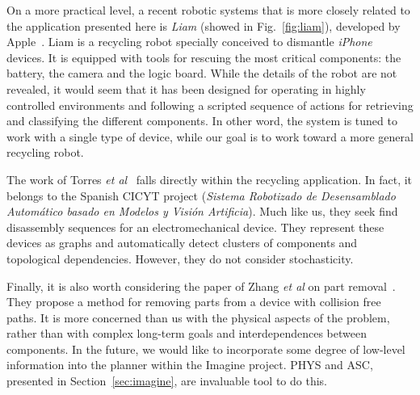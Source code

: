 \documentclass[../root.tex]{subfiles}
\begin{document}
On a more practical level, a recent robotic systems that is more
closely related to the application
presented here is \emph{Liam} (showed in Fig.~\ref{fig:liam}), developed by Apple~\cite{kamps2016apple}.
Liam is a recycling robot specially conceived to dismantle \emph{iPhone}
devices. It is equipped with tools for rescuing the most critical components:
the battery, the camera and the logic board. While the details of the robot
are not revealed, it would seem that it has been designed for operating
in highly controlled environments and following a scripted sequence of
actions for retrieving and classifying the different components. In other
word, the system is tuned to work with a single type of device, while our
goal is to work toward a more general recycling robot.

The work of Torres \textit{et al}~\cite{torresa2003disassembly} falls
directly within the recycling application. In fact, it belongs to the
Spanish CICYT project (\emph{Sistema Robotizado de Desensamblado
Automático basado en Modelos y Visión Artificia}). Much like us, they
seek find disassembly sequences for an electromechanical device. They
represent these devices as graphs and automatically detect clusters of
components and topological dependencies. However, they do not consider
stochasticity.

Finally, it is also worth considering the paper of
Zhang \textit{et al} on part removal~\cite{zhang2008dplan}. They propose
a method for removing parts from a device with collision free paths. It
is more concerned than us with the physical aspects of the problem,
rather than with complex long-term goals and interdependences between
components. In the future, we would like to incorporate some degree
of low-level information into the planner within the Imagine project.
PHYS and ASC, presented in Section~\ref{sec:imagine}, are invaluable
tool to do this.

\end{document}
